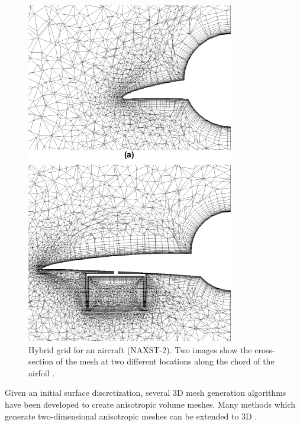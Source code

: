 \begin{figure}
\begin{minipage}{0.45\linewidth}
	\includegraphics[width=\linewidth]{img/intro/lit/ito.png}
	\caption{Hybrid grid for an aircraft (NAXST-2). Two images show the cross-section of the mesh at two different locations along the chord of the airfoil \cite{ito2002unstructured}.}
	\label{fig-ito}
\end{minipage}
\end{figure}

Given an initial surface discretization, several 3D mesh generation algorithms have been developed to create anisotropic volume meshes. Many methods which generate two-dimensional anisotropic  meshes can be extended to 3D \cite{lohner1993matching, nakahashi1987fdm,castro1997anisotropic}.

